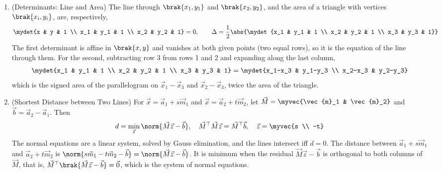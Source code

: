 \begin{enumerate}[label=\thesubsection.\arabic*, ref=\thesubsection.\theenumi,itemsep=1.5em]
\item (Determinants: Line and Area) The line through $\brak{x_1,y_1}$ and $\brak{x_2,y_2}$, and the area of a triangle with vertices $\brak{x_i,y_i}$, are, respectively,
\begin{align}
\mydet{x & y & 1 \\ x_1 & y_1 & 1 \\ x_2 & y_2 & 1} = 0, \qquad
\Delta = \frac{1}{2}\abs{\mydet{x_1 & y_1 & 1 \\ x_2 & y_2 & 1 \\ x_3 & y_3 & 1}}
\label{eq:EE26BTECH11218-cb12-det}
\end{align}
\solution The first determinant is affine in $\brak{x,y}$ and vanishes at both given points (two equal rows), so it is the equation of the line through them. For the second, subtracting row 3 from rows 1 and 2 and expanding along the last column,
\begin{align}
\mydet{x_1 & y_1 & 1 \\ x_2 & y_2 & 1 \\ x_3 & y_3 & 1} = \mydet{x_1-x_3 & y_1-y_3 \\ x_2-x_3 & y_2-y_3}
\end{align}
which is the signed area of the parallelogram on $\vec{x}_1-\vec{x}_3$ and $\vec{x}_2-\vec{x}_3$, twice the area of the triangle.

\item (Shortest Distance between Two Lines) For $\vec{x}=\vec{a}_1+s\vec{m}_1$ and $\vec{x}=\vec{a}_2+t\vec{m}_2$, let $\vec{M}=\myvec{\vec{m}_1 & \vec{m}_2}$ and $\vec{b}=\vec{a}_2-\vec{a}_1$. Then
\begin{align}
d = \min_{\vec{z}}\norm{\vec{M}\vec{z}-\vec{b}}, \quad \vec{M}^{\top}\vec{M}\vec{z} = \vec{M}^{\top}\vec{b}, \quad \vec{z}=\myvec{s \\ -t}
\label{eq:EE26BTECH11218-cb12-skew}
\end{align}
The normal equations are a linear system, solved by Gauss elimination, and the lines intersect iff $d=0$.
\solution The distance between $\vec{a}_1+s\vec{m}_1$ and $\vec{a}_2+t\vec{m}_2$ is $\norm{s\vec{m}_1-t\vec{m}_2-\vec{b}}=\norm{\vec{M}\vec{z}-\vec{b}}$. It is minimum when the residual $\vec{M}\vec{z}-\vec{b}$ is orthogonal to both columns of $\vec{M}$, that is, $\vec{M}^{\top}\brak{\vec{M}\vec{z}-\vec{b}}=\vec{0}$, which is the system of normal equations.


\end{enumerate}
